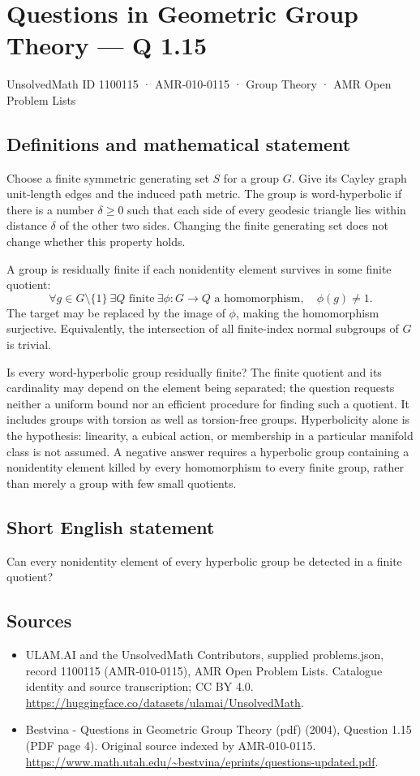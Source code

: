 \documentclass[11pt,a4paper]{article}
\begin{document}
\section*{Questions in Geometric Group Theory — Q 1.15}\label{1100115}
{\small UnsolvedMath ID 1100115 · AMR-010-0115 · Group Theory · AMR Open Problem Lists}
\subsection{Definitions and mathematical statement}
Choose a finite symmetric generating set $S$ for a group $G$. Give its Cayley graph unit-length edges and the induced path metric. The group is word-hyperbolic if there is a number $\delta\geq0$ such that each side of every geodesic triangle lies within distance $\delta$ of the other two sides. Changing the finite generating set does not change whether this property holds.

A group is residually finite if each nonidentity element survives in some finite quotient:
\[
 \forall g\in G\setminus\{1\}\ \exists Q\text{ finite}\
 \exists\phi:G\to Q\text{ a homomorphism},\quad\phi(g)\ne1.
\]
The target may be replaced by the image of $\phi$, making the homomorphism surjective. Equivalently, the intersection of all finite-index normal subgroups of $G$ is trivial.

Is every word-hyperbolic group residually finite? The finite quotient and its cardinality may depend on the element being separated; the question requests neither a uniform bound nor an efficient procedure for finding such a quotient. It includes groups with torsion as well as torsion-free groups. Hyperbolicity alone is the hypothesis: linearity, a cubical action, or membership in a particular manifold class is not assumed. A negative answer requires a hyperbolic group containing a nonidentity element killed by every homomorphism to every finite group, rather than merely a group with few small quotients.
\subsection{Short English statement}
Can every nonidentity element of every hyperbolic group be detected in a finite quotient?
\subsection{Sources}
\begin{itemize}
\item[S1] ULAM.AI and the UnsolvedMath Contributors, supplied problems.json, record 1100115 (AMR-010-0115), AMR Open Problem Lists. Catalogue identity and source transcription; CC BY 4.0.
\url{https://huggingface.co/datasets/ulamai/UnsolvedMath}.
\item[S2] Bestvina - Questions in Geometric Group Theory (pdf) (2004), Question 1.15 (PDF page 4). Original source indexed by AMR-010-0115.
\url{https://www.math.utah.edu/~bestvina/eprints/questions-updated.pdf}.
\end{itemize}
\end{document}
